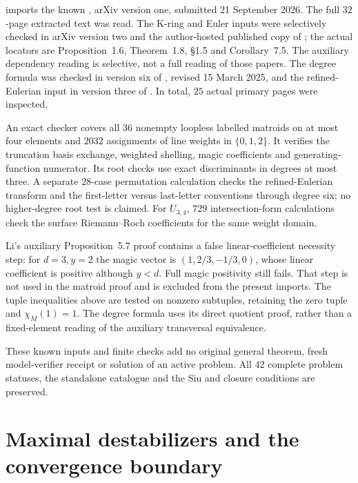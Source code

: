  imports the known
\cite[Theorems~3.6--3.7]{Li26Snapper}, arXiv version one,
submitted 21 September 2026. The full $32$-page extracted
text was read. The K-ring and Euler inputs were selectively
checked in arXiv version two and the author-hosted published
copy of \cite{LLPP24KRings}; the actual locators are
Proposition~1.6, Theorem~1.8, \S1.5 and Corollary~7.5.
The auxiliary dependency reading is selective, not a full
reading of those papers. The degree formula was checked
in version six of \cite[Theorem~5.2.4]{BES24Simplicial},
revised 15 March 2025, and the refined-Eulerian input in
version three of \cite[Corollary~4.5]{BJM19Zonotopes}.
In total, $25$ actual primary pages were inspected.

An exact checker covers all $36$ nonempty loopless labelled
matroids on at most four elements and $2032$ assignments
of line weights in $\{0,1,2\}$. It verifies the truncation
basis exchange, weighted shelling, magic coefficients and
generating-function numerator. Its root checks use exact
discriminants in degrees at most three. A separate $28$-case
permutation calculation checks the refined-Eulerian transform
and the first-letter versus last-letter conventions through
degree six; no higher-degree root test is claimed.
For $U_{3,4}$, $729$ intersection-form calculations check the
surface Riemann--Roch coefficients for the same weight domain.

Li's auxiliary Proposition~5.7 proof contains a false
linear-coefficient necessity step: for $d=3,y=2$ the magic
vector is $(1,2/3,-1/3,0)$, whose linear coefficient is
positive although $y<d$. Full magic positivity still fails.
That step is not used in the matroid proof and is excluded
from the present imports. The tuple inequalities above are
tested on nonzero subtuples, retaining the zero tuple and
$\chi_M(1)=1$. The degree formula uses its direct quotient
proof, rather than a fixed-element reading of the auxiliary
transversal equivalence.

These known inputs and finite checks add no original general
theorem, fresh model-verifier receipt or solution of an active
problem. All $42$ complete problem statuses, the standalone
catalogue and the Siu and closure conditions are preserved.

\section{Maximal destabilizers and the convergence boundary}
\label{sec:provenance-maximal-destabilizers}

